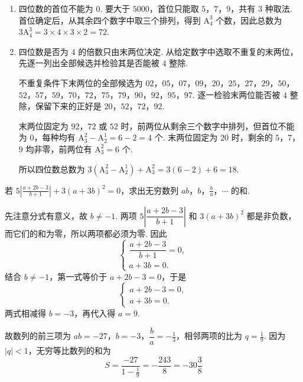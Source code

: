 \begin{solution}
\begin{enumerate}
\item 四位数的首位不能为 \(0\). 要大于 \(5000\)，首位只能取 \(5\)，\(7\)，\(9\)，共有 \(3\) 种取法. 首位确定后，从其余四个数字中取三个排列，得到 \(\mathrm A_4^3\) 个数，因此总数为
\(3\mathrm A_4^3=3\times4\times3\times2=72\).

\item 四位数是否为 \(4\) 的倍数只由末两位决定. 从给定数字中选取不重复的末两位，先逐一列出全部候选并检验其是否能被 \(4\) 整除.

不重复条件下末两位的全部候选为 \(02\)，\(05\)，\(07\)，\(09\)，\(20\)，\(25\)，\(27\)，\(29\)，\(50\)，\(52\)，\(57\)，\(59\)，\(70\)，\(72\)，\(75\)，\(79\)，\(90\)，\(92\)，\(95\)，\(97\). 逐一检验末两位能否被 \(4\) 整除，保留下来的正好是 \(20\)，\(52\)，\(72\)，\(92\).

末两位固定为 \(92\)，\(72\) 或 \(52\) 时，前两位从剩余三个数字中排列，但首位不能为 \(0\)，每种均有 \(\mathrm A_3^2-\mathrm A_2^1=6-2=4\) 个. 末两位固定为 \(20\) 时，剩余的 \(5\)，\(7\)，\(9\) 均非零，前两位有 \(\mathrm A_3^2=6\) 个.

所以四位数总数为
\(3\left(\mathrm A_3^2-\mathrm A_2^1\right)+\mathrm A_3^2=3(6-2)+6=18\).
\end{enumerate}
\end{solution}

\begin{problem}
若 \(5\left| \frac{a+2b-3}{b+1} \right|+3 \left( a+3b \right)^2=0\)，求出无穷数列 \(ab\)，\(b\)，\(\frac{b}{a}\)，\(\cdots\) 的和.
\end{problem}

\begin{solution}
先注意分式有意义，故 \(b\ne-1\). 两项 \(5\left|\dfrac{a+2b-3}{b+1}\right|\) 和 \(3(a+3b)^2\) 都是非负数，而它们的和为零，所以两项都必须为零. 因此
\[
\begin{cases}
\dfrac{a+2b-3}{b+1}=0,\\
a+3b=0.
\end{cases}
\]
结合 \(b\ne-1\)，第一式等价于 \(a+2b-3=0\)，于是
\[
\begin{cases}
a+2b-3=0,\\
a+3b=0.
\end{cases}
\]
两式相减得 \(b=-3\)，再代入得 \(a=9\).

故数列的前三项为 \(ab=-27\)，\(b=-3\)，\(\dfrac{b}{a}=-\frac{1}{3}\)，相邻两项的比为 \(q=\frac{1}{9}\). 因为 \(|q|<1\)，无穷等比数列的和为
\[
S=\frac{-27}{1-\frac{1}{9}}=-\frac{243}{8}=-30\frac{3}{8}
\]
\end{solution}

